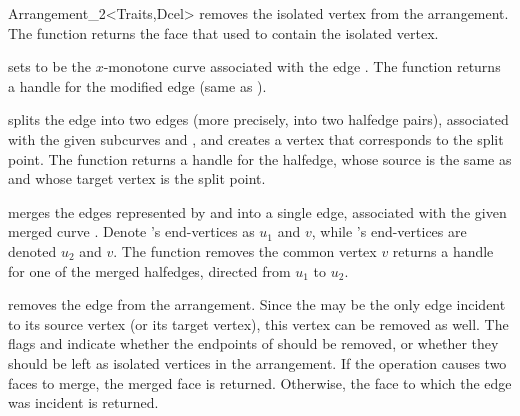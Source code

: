 \begin{ccRefClass}{Arrangement_2<Traits,Dcel>}
   {removes the isolated vertex  from the arrangement. The function
    returns the face  that used to contain the isolated vertex.
    }

   {sets  to be the $x$-monotone curve associated with the edge .
    The function returns a handle for the modified edge (same as ).
    }

  {splits the edge  into two edges (more precisely, into two halfedge
   pairs), associated with the given subcurves  and , and
   creates a vertex that corresponds to the split point. 
   The function returns a handle for the halfedge, whose source is the same
   as  and whose target vertex is the split point.
   }

  {merges the edges represented by  and  into
   a single edge, associated with the given merged curve .
   Denote 's end-vertices as $u_1$ and $v$, while 's
   end-vertices are denoted $u_2$ and $v$. The function removes the
   common vertex $v$ returns a handle for one of the merged halfedges,
   directed from $u_1$ to $u_2$.
   }

  {removes the edge  from the arrangement. Since the  may
   be the only edge incident to its source vertex (or its target vertex),
   this vertex can be removed as well. The flags  and
    indicate whether the endpoints of  should be
   removed, or whether they should be left as isolated vertices in the
   arrangement.
   If the operation causes two faces to merge, the merged face is returned.
   Otherwise, the face to which the edge was incident is returned.}


\end{ccRefClass}
